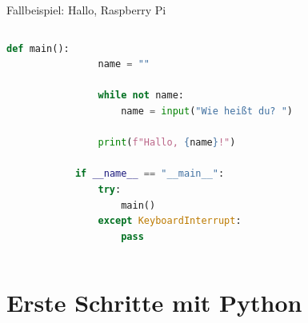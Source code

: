 {\begin{frame}{Fallbeispiel: Hallo, Raspberry Pi}
\begin{columns}


        \begin{lstlisting}[language=Python, gobble=12]
            def main():
                name = ""

                while not name:
                    name = input("Wie heißt du? ")

                print(f"Hallo, {name}!")

            if __name__ == "__main__":
                try:
                    main()
                except KeyboardInterrupt:
                    pass
        \end{lstlisting}

        \bigskip

    \end{columns}
\end{frame}
}

\section{Erste Schritte mit Python}

